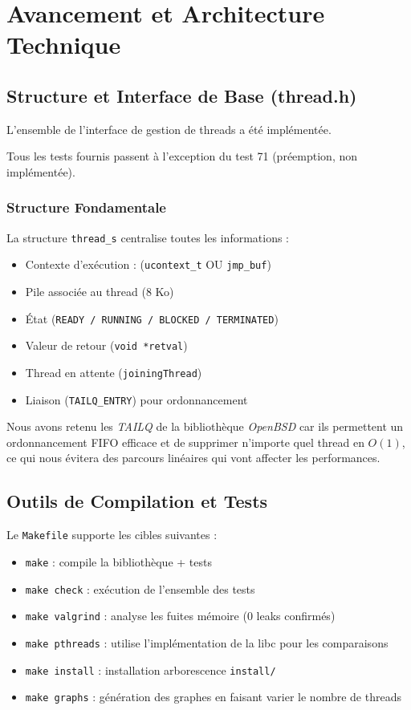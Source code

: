 \section{Avancement et Architecture Technique}

\subsection{Structure et Interface de Base (thread.h)}
L'ensemble de l'interface de gestion de threads a été implémentée.

Tous les tests fournis passent à l'exception du test 71 (préemption, non implémentée).

\subsubsection*{Structure Fondamentale}
La structure \texttt{thread\_s} centralise toutes les informations :
\begin{itemize}
    \item Contexte d'exécution : (\texttt{ucontext\_t} OU \texttt{jmp\_buf})
    \item Pile associée au thread (8 Ko)
    \item État (\texttt{READY / RUNNING / BLOCKED / TERMINATED})
    \item Valeur de retour (\texttt{void *retval})
    \item Thread en attente (\texttt{joiningThread})
    \item Liaison (\texttt{TAILQ\_ENTRY}) pour ordonnancement
\end{itemize}
Nous avons retenu les \textit{TAILQ} de la bibliothèque \textit{OpenBSD} car
ils permettent un ordonnancement FIFO efficace et de supprimer n'importe quel
thread en $O(1)$, ce qui nous évitera des parcours linéaires qui vont affecter
les performances.

\subsection{Outils de Compilation et Tests}
Le \texttt{Makefile} supporte les cibles suivantes :
\begin{itemize}
    \item \texttt{make} : compile la bibliothèque + tests
    \item \texttt{make check} : exécution de l'ensemble des tests
    \item \texttt{make valgrind} : analyse les fuites mémoire (0 leaks confirmés)
    \item \texttt{make pthreads} : utilise l'implémentation de la libc pour les comparaisons
    \item \texttt{make install} : installation arborescence \texttt{install/}
    \item \texttt{make graphs} : génération des graphes en faisant varier le nombre de threads
\end{itemize}

